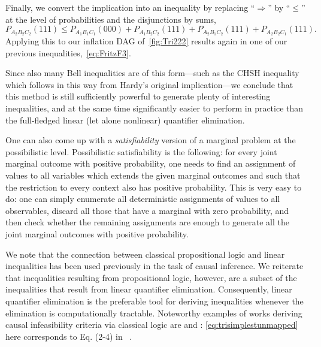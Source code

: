 Finally, we convert the implication into an inequality by replacing ``$\Rightarrow$'' by ``$\leq$'' at the level of probabilities and the disjunctions by sums,
\[
	P_{A_2 B_2 C_2}(111) \leq P_{A_1 B_1 C_1}(000) + P_{A_1 B_2 C_2}(111) + P_{A_2 B_1 C_2}(111) + P_{A_2 B_2 C_1}(111).
\]
Applying this to our inflation DAG of~\cref{fig:Tri222} results again in one of our previous inequalities,~\cref{eq:FritzF3}.

Since also many Bell inequalities are of this form---such as the CHSH inequality which follows in this way from Hardy's original implication---we conclude that this method is still sufficiently powerful to generate plenty of interesting inequalities, and at the same time significantly easier to perform in practice than the full-fledged linear (let alone nonlinear) quantifier elimination.

One can also come up with a \emph{satisfiability} version of a marginal problem at the possibilistic level. Possibilistic satisfiability is the following: for every joint marginal outcome with positive probability, one needs to find an assignment of values to all variables which extends the given marginal outcomes and such that the restriction to every context also has positive probability. This is very easy to do: one can simply enumerate all deterministic assignments of values to all observables, discard all those that have a marginal with zero probability, and then check whether the remaining assignments are enough to generate all the joint marginal outcomes with positive probability.

We note that the connection between classical propositional logic and linear inequalities has been used previously in the task of causal inference. We reiterate that inequalities resulting from propositional logic, however, are a subset of the inequalities that result from linear quantifier elimination. Consequently, linear quantifier elimination is the preferable tool for deriving inequalities whenever the elimination is computationally tractable. Noteworthy examples of works deriving causal infeasibility criteria via classical logic are \citet{Pitowsky1989} and \citet{Ghirardi08}: \cref{eq:trisimplestunmapped} here corresponds to Eq. (2-4) in~\cite{Pitowsky1989}%
.






